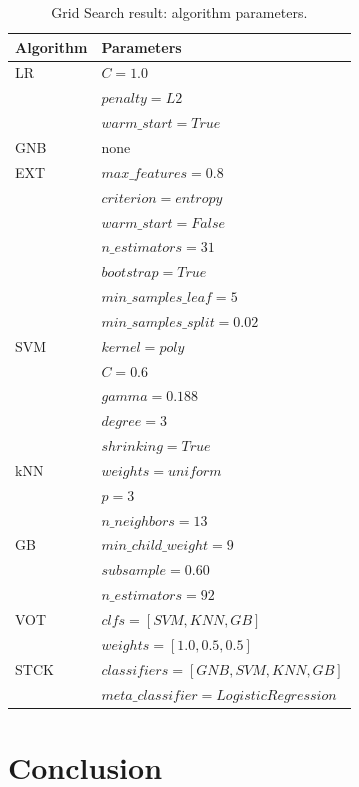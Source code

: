 \begin{table}[h]
\centering
\caption{Grid Search result: algorithm parameters.}
\label{tab:params}
\begin{tabular}{| l | l |}
\hline
Algorithm & Parameters \\ \hline 
LR        & $C=1.0$ \\ 
          & $penalty=L2$ \\
          & $warm\_start=True$ \\ \hline
GNB       & none \\ \hline
EXT       & $max\_features=0.8$ \\ 
          & $criterion=entropy$ \\
          & $warm\_start=False$ \\
          & $n\_estimators=31$ \\
          & $bootstrap=True$ \\
          & $min\_samples\_leaf=5$ \\ 
          & $min\_samples\_split=0.02$ \\ \hline
SVM       & $kernel=poly$ \\
          & $C=0.6$ \\
          & $gamma=0.188$ \\ 
          & $degree=3$ \\
          & $shrinking=True$ \\ \hline
kNN       & $weights=uniform$ \\
          & $p=3$ \\
          & $n\_neighbors=13$ \\ \hline
GB        & $min\_child\_weight=9 $ \\
          & $subsample=0.60$ \\ 
          & $n\_estimators=92$ \\ \hline
VOT       & $clfs=[SVM, KNN, GB]$ \\
          & $weights=[1.0, 0.5, 0.5]$ \\ \hline
STCK      & $classifiers=[GNB, SVM, KNN, GB]$ \\
          & $meta\_classifier=LogisticRegression$ \\          
\hline
\end{tabular}
\end{table}

\section{Conclusion}\label{sec:con}
